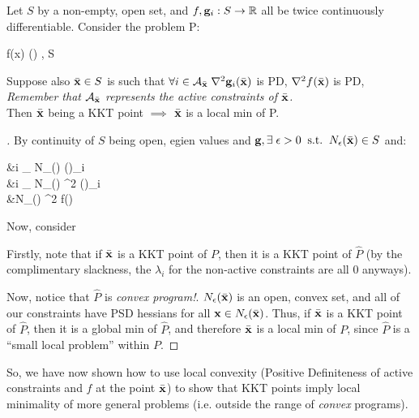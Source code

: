 \begin{theo}{}{}
	Let $S$ by a non-empty, open set, and $f, \mathbf{g}_i: S \rightarrow \mathbb{R}$ all be
	twice continuously differentiable. Consider the problem P:
	\begin{frml}
		\min f(x) \st \vg(\vx) \leq \vzero, \vx \in S
	\end{frml}
	Suppose also $\bar{\mathbf{x}} \in S$ is such that $\forall i \in \mathcal{A}_{\bar{\mathbf{x}}} \; \nabla^2\mathbf{g}_i(\bar{\mathbf{x}})$ is
	PD, $\nabla^2f(\bar{\mathbf{x}})$ is PD, 
\medskip\\
\textit{Remember that $\mathcal{A}_{\bar{\mathbf{x}}}$ represents the active constraints of $\bar{\mathbf{x}}$.}
\medskip\\
	Then $\bar{\mathbf{x}}$ being a KKT point $\implies$
	$\bar{\mathbf{x}}$ is a local min of P.
\end{theo}

\begin{proof}[]
By continuity of $S$ being open, egien values and $\mathbf{g}, \exists \; \epsilon > 0
\;\; \text{s.t.} \;\;
	N_\epsilon(\bar{\mathbf{x}}) \in S$ and:
\begin{frml}
	&\forall i \notin {}_{\bx} \; \forall \vx \in N_\epsilon(\bx)  \vg(\vx)_i  \\
	&\forall i \in {}_{\bx} \; \forall \vx \in N_\epsilon(\bx)  \nabla^2 \vg(\vx)_i  \\
	&\forall \vx \in N_\epsilon(\bx)  \nabla^2 f(\vx) \text{ is PSD}
\end{frml}

Now, consider 

Firstly, note that if $\bar{\mathbf{x}}$ is a KKT point of $P$, then it is a KKT point of
$\hat P$ (by the complimentary slackness, the $\lambda_i$ for the non-active constraints
are all $0$ anyways).

Now, notice that $\hat P$ is  \textit{convex program!}. $N_{\epsilon}(\bar{\mathbf{x}})$ is an open, convex set,
and all of our constraints have PSD hessians for all $\mathbf{x} \in N_\epsilon (\bar{\mathbf{x}})$.
Thus, if $\bar{\mathbf{x}}$ is a KKT point of $\hat P$, then it is a global min of $\hat P$,
and therefore $\bar{\mathbf{x}}$ is a local min of $P$, since $\hat P$ is a ``small local problem''
within $P$.

\end{proof}

So, we have now shown how to use local convexity (Positive Definiteness of active
constraints and $f$ at the point $\bar{\mathbf{x}}$) to show that KKT points imply local
minimality of more general problems (i.e. outside the range of \textit{convex} 
programs).

